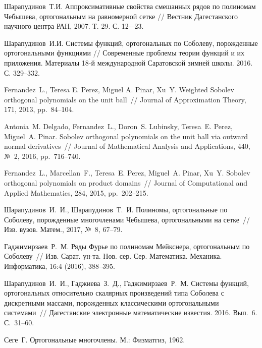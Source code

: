 \begin{thebibliography}{20}
{Шарапудинов~Т.И.}
Аппроксимативные свойства смешанных рядов по полиномам Чебышева, ортогональным на равномерной сетке //
Вестник Дагестанского научного центра РАН, 2007. Т. 29. С. 12-–23.



{Шарапудинов~И.И.}
Системы функций, ортогональных по Соболеву, порожденные ортогональными функциями //
Современные проблемы теории функций и их приложения.  Материалы 18-й международной Саратовской зимней школы. 2016. С. 329--332.



{Fernandez~L., Teresa E. Perez, Miguel A. Pinar, Xu~Y.} Weighted Sobolev orthogonal polynomials on the unit ball~// Journal of Approximation Theory, 171, 2013, pp.~84--104.



{Antonia~M. Delgado, Fernandez~L., Doron~S. Lubinsky, Teresa~E. Perez, Miguel~A. Pinar.} Sobolev orthogonal polynomials on the unit ball via outward normal derivatives~// Journal of Mathematical Analysis and Applications, 440, №~2, 2016, pp.~716--740.



{Fernandez~L., Marcellan~F., Teresa~E. Perez, Miguel~A. Pinar, Xu~Y.} Sobolev orthogonal polynomials on product domains~// Journal of Computational and Applied Mathematics, 284, 2015, pp.~202--215.



{Шарапудинов~И.~И., Шарапудинов~Т.~И.} Полиномы, ортогональные по Соболеву, порожденные многочленами Чебышева, ортогональными на сетке~// Изв. вузов. Матем., 2017, №~8, 67--79.



{Гаджимирзаев~Р.~М.} Ряды Фурье по полиномам Мейкснера, ортогональным по Соболеву~// Изв. Сарат. ун-та. Нов. сер. Сер. Математика. Механика. Информатика, 16:4 (2016), 388--395.



{Шарапудинов~И.~И., Гаджиева~З.~Д., Гаджимирзаев~Р.~М.} Системы функций, ортогональных относительно скалярных произведений типа Соболева с дискретными массами, порожденных классическими ортогональными системами~// Дагестанские электронные математические известия. 2016. Вып.~6. С.~31--60.



{Сеге~Г.} Ортогональные многочлены. М.: Физматгиз, 1962.



\end{thebibliography}
